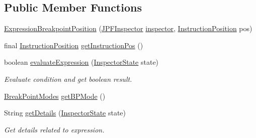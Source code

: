 \subsection*{Public Member Functions}
\begin{DoxyCompactItemize}
\item 
\hyperlink{classgov_1_1nasa_1_1jpf_1_1inspector_1_1server_1_1expression_1_1expressions_1_1_expression_breakpoint_position_ad500748c7b7ce16f05862379d879e598}{Expression\+Breakpoint\+Position} (\hyperlink{classgov_1_1nasa_1_1jpf_1_1inspector_1_1server_1_1jpf_1_1_j_p_f_inspector}{J\+P\+F\+Inspector} \hyperlink{classgov_1_1nasa_1_1jpf_1_1inspector_1_1server_1_1expression_1_1expressions_1_1_expression_breakpoint_position_a8a3d5dc750a8f629e27046cd30eb34f7}{inspector}, \hyperlink{interfacegov_1_1nasa_1_1jpf_1_1inspector_1_1interfaces_1_1_instruction_position}{Instruction\+Position} pos)
\item 
final \hyperlink{interfacegov_1_1nasa_1_1jpf_1_1inspector_1_1interfaces_1_1_instruction_position}{Instruction\+Position} \hyperlink{classgov_1_1nasa_1_1jpf_1_1inspector_1_1server_1_1expression_1_1expressions_1_1_expression_breakpoint_position_ac0eaa028cd9054eafbe2c47bcebd552f}{get\+Instruction\+Pos} ()
\item 
boolean \hyperlink{classgov_1_1nasa_1_1jpf_1_1inspector_1_1server_1_1expression_1_1expressions_1_1_expression_breakpoint_position_a79a13d6555f1168da4468a1fada1e04c}{evaluate\+Expression} (\hyperlink{interfacegov_1_1nasa_1_1jpf_1_1inspector_1_1server_1_1expression_1_1_inspector_state}{Inspector\+State} state)
\begin{DoxyCompactList}\small\item\em Evaluate condition and get boolean result. \end{DoxyCompactList}\item 
\hyperlink{enumgov_1_1nasa_1_1jpf_1_1inspector_1_1server_1_1breakpoints_1_1_break_point_modes}{Break\+Point\+Modes} \hyperlink{classgov_1_1nasa_1_1jpf_1_1inspector_1_1server_1_1expression_1_1expressions_1_1_expression_breakpoint_position_a52a8a727b070e56dba38a34960beecf4}{get\+B\+P\+Mode} ()
\item 
String \hyperlink{classgov_1_1nasa_1_1jpf_1_1inspector_1_1server_1_1expression_1_1expressions_1_1_expression_breakpoint_position_adbc1aa323bbfab6011e9557c85734456}{get\+Details} (\hyperlink{interfacegov_1_1nasa_1_1jpf_1_1inspector_1_1server_1_1expression_1_1_inspector_state}{Inspector\+State} state)
\begin{DoxyCompactList}\small\item\em Get details related to expression. \end{DoxyCompactList}\item 

\end{DoxyCompactItemize}
